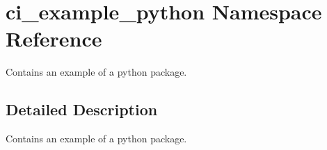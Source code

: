 \hypertarget{namespaceci__example__python}{}\section{ci\+\_\+example\+\_\+python Namespace Reference}
\label{namespaceci__example__python}


Contains an example of a python package.  




\subsection{Detailed Description}
Contains an example of a python package. 
